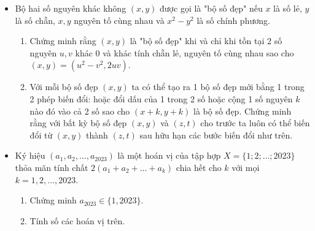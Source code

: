 \documentclass[11pt]{scrartcl}
\begin{document}
\begin{itemize}[label=, leftmargin=0em, itemsep=0.5em]
\begin{btvn}
    \end{btvn}
    
    \item \begin{btvn}
    Bộ hai số nguyên khác không $(x, y)$ được gọi là "bộ số đẹp" nếu $x$ là số lẻ, $y$ là số chẵn, $x, y$ nguyên tố cùng nhau và $x^2 - y^2$ là số chính phương.
    \begin{enumerate}
        \item Chứng minh rằng $(x, y)$ là "bộ số đẹp" khi và chỉ khi tồn tại 2 số nguyên $u, v$ khác $0$ và khác tính chẵn lẻ, nguyên tố cùng nhau sao cho $(x, y) = (u^2 - v^2, 2uv)$.
        \item Với mỗi bộ số đẹp $(x, y)$ ta có thể tạo ra 1 bộ số đẹp mới bằng 1 trong 2 phép biến đổi: hoặc đổi dấu của 1 trong 2 số hoặc cộng 1 số nguyên $k$ nào đó vào cả 2 số sao cho $(x + k, y + k)$ là bộ số đẹp. Chứng minh rằng với bất kỳ bộ số đẹp $(x, y)$ và $(z, t)$ cho trước ta luôn có thể biến đổi từ $(x, y)$ thành $(z, t)$ sau hữu hạn các bước biến đổi như trên.
    \end{enumerate}
    
    \end{btvn}
    \item \begin{btvn} Ký hiệu $(a_1, a_2, \ldots, a_{2023})$ là một hoán vị của tập hợp $X = \{1; 2; \ldots; 2023\}$ thỏa mãn tính chất $2(a_1 + a_2 + \ldots + a_k)$ chia hết cho $k$ với mọi $k = 1, 2, \ldots, 2023$.
        \begin{enumerate}
            \item Chứng minh $a_{2023} \in \{1, 2023\}$.
            \item Tính số các hoán vị trên.
        \end{enumerate}
    \end{btvn}


\end{itemize}
\end{document}

